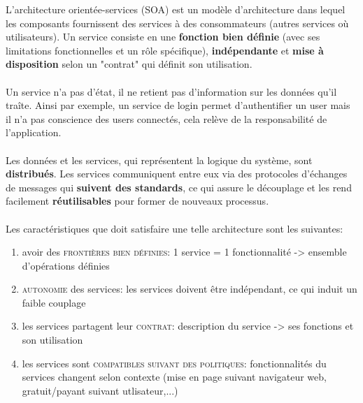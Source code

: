 \item{}
{
L'architecture orientée-services (SOA) est un modèle d'architecture dans lequel les composants fournissent des services à des consommateurs (autres services où utilisateurs). Un service consiste en une \textbf{fonction bien définie} (avec ses limitations fonctionnelles et un rôle spécifique), \textbf{indépendante} et \textbf{mise à disposition} selon un "contrat" qui définit son utilisation.
\paragraph{}
Un service n'a pas d'état, il ne retient pas d'information sur les données qu'il traîte. Ainsi par exemple, un service de login permet d'authentifier un user mais il n'a pas conscience des users connectés, cela relève de la responsabilité de l'application.
\paragraph{}
Les données et les services, qui représentent la logique du système, sont \textbf{distribués}. Les services communiquent entre eux via des protocoles d'échanges de messages qui \textbf{suivent des standards}, ce qui assure le découplage et les rend facilement \textbf{réutilisables} pour former de nouveaux processus.
\paragraph{}
Les caractéristiques que doit satisfaire une telle architecture sont les suivantes:
\begin{enumerate}
\item avoir des \textcolor{ltred}{\textsc{frontières bien définies}}: 1 service = 1 fonctionnalité -> ensemble d'opérations définies
\item \textcolor{ltred}{\textsc{autonomie}} des services: les services doivent être indépendant, ce qui induit un faible couplage
\item les services partagent leur \textcolor{ltred}{\textsc{contrat}}: description du service -> ses fonctions et son utilisation
\item les services sont \textcolor{ltred}{\textsc{compatibles suivant des politiques}}: fonctionnalités du services changent selon contexte  (mise en page suivant navigateur web, gratuit/payant suivant utlisateur,...)
\end{enumerate}

}
